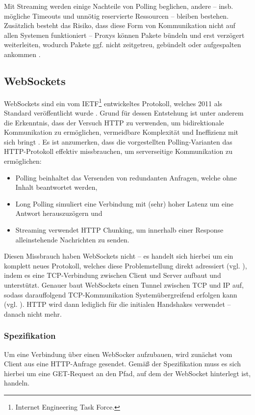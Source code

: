 \documentclass[sigplan, screen]{acmart}
\begin{document}
Mit Streaming werden einige Nachteile von Polling beglichen, andere -- insb. mögliche Timeouts und unnötig reservierte Ressourcen -- bleiben bestehen.
Zusätzlich besteht das Risiko, dass diese Form von Kommunikation nicht auf allen Systemen funktioniert --
Proxys können Pakete bündeln und erst verzögert weiterleiten, wodurch Pakete ggf. nicht zeitgetreu, gebündelt oder aufgespalten ankommen \cite[Abs. 3.2]{saint-andre_known_2011}.

\subsection{WebSockets}

WebSockets sind ein vom IETF\footnote{Internet Engineering Task Force.} entwickeltes Protokoll,
welches 2011 als Standard veröffentlicht wurde \cite{melnikov_websocket_2011}.
Grund für dessen Entstehung ist unter anderem die Erkenntnis, dass der Versuch HTTP zu verwenden,
um bidirektionale Kommunikation zu ermöglichen, vermeidbare Komplexität und Ineffizienz mit sich bringt \cite[S. 137f]{lubbers_pro_2010}.
Es ist anzumerken, dass die vorgestellten Polling-Varianten das HTTP-Protokoll effektiv missbrauchen,
um serverseitige Kommunikation zu ermöglichen:

\begin{itemize}
  \item Polling beinhaltet das Versenden von redundanten Anfragen, welche ohne Inhalt beantwortet werden,
  \item Long Polling simuliert eine Verbindung mit (sehr) hoher Latenz um eine Antwort herauszuzögern und
  \item Streaming verwendet HTTP Chunking, um innerhalb einer Response alleinstehende Nachrichten zu senden.
\end{itemize} 

Diesen Missbrauch haben WebSockets nicht -- es handelt sich hierbei um ein komplett neues Protokoll,
welches diese Problemstellung direkt adressiert (vgl. \cite[Abs. 1.1]{melnikov_websocket_2011}),
indem es eine TCP-Verbindung zwischen Client und Server aufbaut und unterstützt.
Genauer baut WebSockets einen Tunnel zwischen TCP und IP auf, sodass darauffolgend TCP-Kommunikation Systemübergreifend erfolgen kann (vgl. \cite[Abs. 1.5]{melnikov_websocket_2011}).
HTTP wird dann lediglich für die initialen Handshakes verwendet -- danach nicht mehr.

\subsubsection{Spezifikation}
Um eine Verbindung über einen WebSocker aufzubauen, wird zunächst vom Client aus eine HTTP-Anfrage gesendet.
Gemäß der Spezifikation muss es sich hierbei um eine GET-Request an den Pfad, auf dem der WebSocket hinterlegt ist, handeln.
\end{document}
